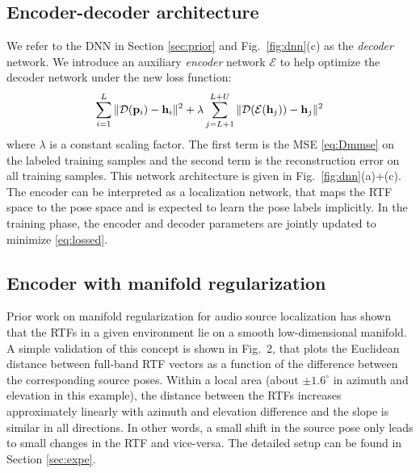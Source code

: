 \documentclass{article}
\newif\ifproofread
\newcommand{\pfmarker}[1]{%
\ifproofread
\textcolor{red}{#1}%
\else
#1%
\fi
}
\begin{document}
\subsection{Encoder-decoder architecture}
\label{subsec:archi}
We refer to the DNN in Section \ref{sec:prior} and Fig.~\ref{fig:dnn}(c) as the \emph{decoder} network. We introduce an auxiliary \emph{encoder} network $\mathcal{E}$ to help optimize the decoder network under the new loss function:
\begin{equation}\label{eq:lossed}
\sum_{i=1}^{L}\|\mathcal{D}({\bf p}_i)-{\bf h}_i\|^2 + \lambda \sum_{\pfmarker{j=L+1}}^{L+U}\|\mathcal{D}(\mathcal{E}({\bf h}_j))-{\bf h}_j\|^2
\end{equation}
where $\lambda$ is a constant scaling factor. The first term is the MSE \eqref{eq:Dmmse} on the labeled training samples and the second term is the reconstruction error on all training samples. This network architecture is given in Fig.~\ref{fig:dnn}(a)+(c). The encoder can be interpreted as a localization network, that maps the RTF space to the pose space and is expected to learn the pose labels implicitly. In the training phase, the encoder and decoder parameters are jointly updated to minimize \eqref{eq:lossed}.

\subsection{Encoder with manifold regularization}
\label{subsec:manifold}
Prior work on manifold regularization for audio source localization \cite{laufer2016mr} has shown that the RTFs in a given environment lie on a smooth low-dimensional manifold. A simple validation of this concept is shown in Fig.~2, that plots the Euclidean distance between full-band RTF vectors as a function of the difference between the corresponding source poses. Within a local area (about $\pm 1.6^\circ$ in azimuth and elevation in this example), the distance between the RTFs increases approximately linearly with azimuth and elevation difference and the slope is similar in all directions. In other words, a small shift in the source pose only leads to small changes in the RTF and vice-versa. The detailed setup can be found in Section \ref{sec:expe}.
\end{document}
